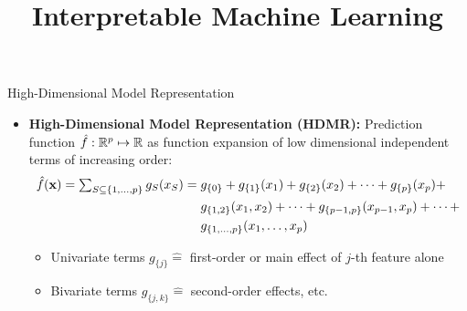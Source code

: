 \documentclass[11pt,compress,t,notes=noshow, aspectratio=169, xcolor=table]{beamer}
\title{Interpretable Machine Learning}
\date{}
\begin{document}
\newcommand{\titlefigure}{figure/open_blackbox}
\newcommand{\learninggoals}{
\item What are additive decomposition of prediction functions?
\item Why are they useful?
\item How do we obtain them?}

 
\begin{frame}{High-Dimensional Model Representation }

\begin{itemize}
\item \textbf{High-Dimensional Model Representation (HDMR):} Prediction function $\fh: \mathbb{R}^p \mapsto \mathbb{R}$ as function expansion of low dimensional independent terms of increasing order:
\begin{equation*}
\begin{split}
\fh(\xv) =  %
\textstyle\sum_{S \subseteq \{1,\ldots,p\}} g_{S}(x_S) = \; & g_{\{0\}} + g_{\{1\}}(x_1) + g_{\{2\}}(x_2) + \dots + g_{\{p\}}(x_p) + \\
& g_{\{1, 2\}}(x_1, x_2) + \dots + g_{\{p-1, p\}}(x_{p-1}, x_p) + \dots + \\
& g_{\{1,\ldots,p\}}(x_1, \ldots, x_p)
\end{split}
\end{equation*}
\vspace{-5pt}
\begin{itemize}
\item Univariate terms $g_{\{j\}} \hat = $ first-order or main effect of $j$-th feature alone
\item Bivariate terms $g_{\{j, k\}} \hat = $ second-order effects, etc.
\end{itemize}

\end{itemize}
\end{frame}
\end{document}
